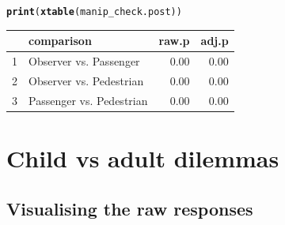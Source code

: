 \documentclass{scrartcl}\usepackage[]{graphicx}\usepackage[]{color}
\makeatletter
\newcommand{\hlstd}[1]{\textcolor[rgb]{0.345,0.345,0.345}{#1}}%
\newcommand{\hlkwd}[1]{\textcolor[rgb]{0.737,0.353,0.396}{\textbf{#1}}}%
\newenvironment{kframe}{%
 \def\at@end@of@kframe{}%
 \ifinner\ifhmode%
  \def\at@end@of@kframe{\end{minipage}}%
  \begin{minipage}{\columnwidth}%
 \fi\fi%
 \def\FrameCommand##1{\hskip\@totalleftmargin \hskip-\fboxsep
 \colorbox{shadecolor}{##1}\hskip-\fboxsep
     \hskip-\linewidth \hskip-\@totalleftmargin \hskip\columnwidth}%
 \MakeFramed {\advance\hsize-\width
   \@totalleftmargin\z@ \linewidth\hsize
   \@setminipage}}%
 {\par\unskip\endMakeFramed%
 \at@end@of@kframe}
\makeatother
\begin{document}
\begin{kframe}\begin{alltt}
\hlkwd{print}\hlstd{(}\hlkwd{xtable}\hlstd{(manip_check.post))}
\end{alltt}
\end{kframe}%
\begin{table}[ht]
\centering
\begin{tabular}{rlrr}
  \hline
 & comparison & raw.p & adj.p \\ 
  \hline
1 & Observer vs. Passenger & 0.00 & 0.00 \\ 
  2 & Observer vs. Pedestrian & 0.00 & 0.00 \\ 
  3 & Passenger vs. Pedestrian & 0.00 & 0.00 \\ 
   \hline
\end{tabular}
\end{table}


\section{Child vs adult dilemmas}
\label{sec:child}

\subsection{Visualising the raw responses}
\label{sec:child-raw}
\end{document}
